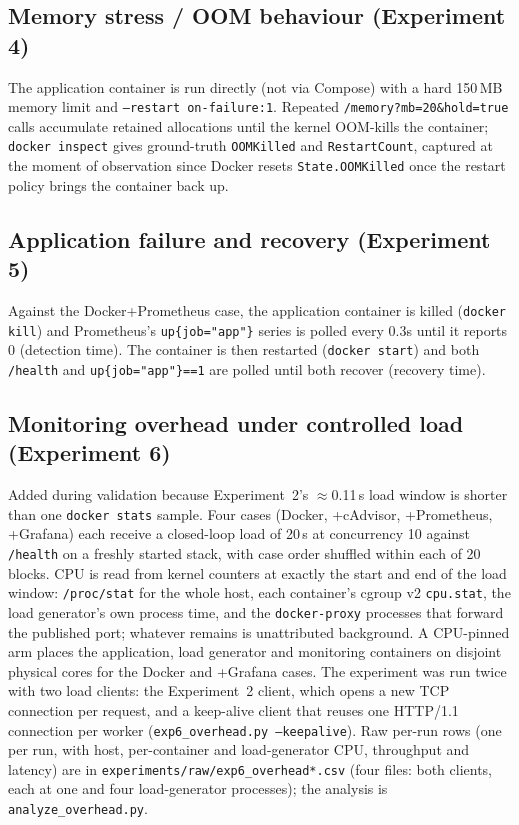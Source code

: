 \documentclass[conference]{IEEEtran}
\begin{document}
\subsection{Memory stress / OOM behaviour (Experiment 4)}
The application container is run directly (not via Compose) with a hard
150\,MB memory limit and \texttt{--restart on-failure:1}. Repeated
\texttt{/memory?mb=20\&hold=true} calls accumulate retained allocations until
the kernel OOM-kills the container; \texttt{docker inspect} gives
ground-truth \texttt{OOMKilled} and \texttt{RestartCount}, captured at the
moment of observation since Docker resets \texttt{State.OOMKilled} once the
restart policy brings the container back up.

\subsection{Application failure and recovery (Experiment 5)}
Against the Docker+Prometheus case, the application container is killed
(\texttt{docker kill}) and Prometheus's \texttt{up\{job="app"\}} series is
polled every 0.3s until it reports 0 (detection time). The container is then
restarted (\texttt{docker start}) and both \texttt{/health} and
\texttt{up\{job="app"\}==1} are polled until both recover (recovery time).

\subsection{Monitoring overhead under controlled load (Experiment 6)}
\label{sec:e6method}
Added during validation because Experiment~2's $\approx$0.11\,s load window is
shorter than one \texttt{docker stats} sample. Four cases (Docker,
+cAdvisor, +Prometheus, +Grafana) each receive a closed-loop load of 20\,s
at concurrency 10 against \texttt{/health} on a freshly started stack, with
case order shuffled within each of 20 blocks. CPU is read from kernel
counters at exactly the start and end of the load window: \texttt{/proc/stat}
for the whole host, each container's cgroup v2 \texttt{cpu.stat}, the load
generator's own process time, and the \texttt{docker-proxy} processes that
forward the published port; whatever remains is unattributed background. A
CPU-pinned arm places the application, load generator and monitoring
containers on disjoint physical cores for the Docker and +Grafana cases. The
experiment was run twice with two load clients: the Experiment~2 client,
which opens a new TCP connection per request, and a keep-alive client that
reuses one HTTP/1.1 connection per worker
(\texttt{exp6\_overhead.py --keepalive}). Raw per-run rows (one per run, with
host, per-container and load-generator CPU, throughput and latency) are in
\texttt{experiments/raw/exp6\_overhead*.csv}
(four files: both clients, each at one and four load-generator processes); the
analysis is \texttt{analyze\_overhead.py}.
\end{document}
